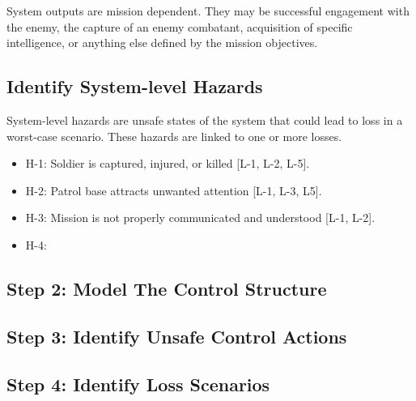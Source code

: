 \documentclass[../../main/main.tex]{subfiles}
\begin{document}
System outputs are mission dependent.  They may be successful engagement with the enemy, the capture of an enemy combatant, acquisition of specific intelligence, or anything else defined by the mission objectives.

\subsection{Identify System-level Hazards}
System-level hazards are unsafe states of the system that could lead to loss in a worst-case scenario. These hazards are linked to one or more losses.

\begin{itemize}
\item H-1: Soldier is captured, injured, or killed [L-1, L-2, L-5].\\
\item H-2: Patrol base attracts unwanted attention [L-1, L-3, L5].\\
\item H-3: Mission is not properly communicated and understood [L-1, L-2].\\
\item H-4: 

\end{itemize}



\subsection{Step 2: Model The Control Structure}


\subsection{Step 3: Identify Unsafe Control Actions}
\subsection{Step 4: Identify Loss Scenarios}
\end{document}
